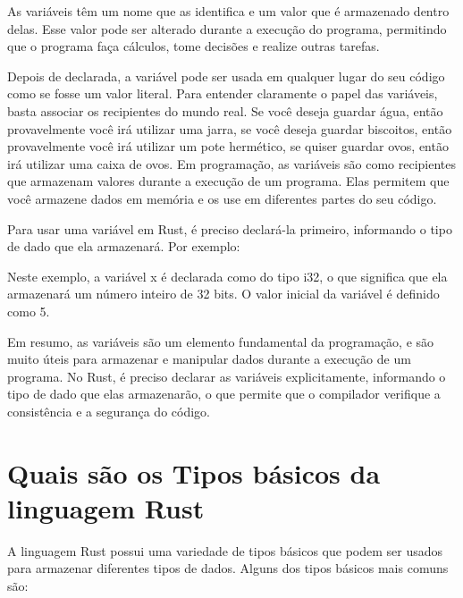 \documentclass[12pt,a4paper,oneside]{abntex2}
\begin{document}
As variáveis têm um nome que as identifica e um valor que é armazenado dentro delas. Esse valor pode ser alterado durante a execução do programa, permitindo que o programa faça cálculos, tome decisões e realize outras tarefas.

Depois de declarada, a variável pode ser usada em qualquer lugar do seu código como se fosse um valor literal. Para entender claramente o papel das variáveis, basta associar os recipientes do mundo real. Se você deseja guardar água, então provavelmente você irá utilizar uma jarra, se você deseja guardar biscoitos, então provavelmente você irá utilizar um pote hermético, se quiser guardar ovos, então irá utilizar uma caixa de ovos. 
Em programação, as variáveis são como recipientes que armazenam valores durante a execução de um programa. Elas permitem que você armazene dados em memória e os use em diferentes partes do seu código.

Para usar uma variável em Rust, é preciso declará-la primeiro, informando o tipo de dado que ela armazenará. Por exemplo:

%

Neste exemplo, a variável x é declarada como do tipo i32, o que significa que ela armazenará um número inteiro de 32 bits. O valor inicial da variável é definido como 5.


%

Em resumo, as variáveis são um elemento fundamental da programação, e são muito úteis para armazenar e manipular dados durante a execução de um programa. No Rust, é preciso declarar as variáveis explicitamente, informando o tipo de dado que elas armazenarão, o que permite que o compilador verifique a consistência e a segurança do código.

\section{Quais são os Tipos básicos da linguagem Rust}

A linguagem Rust possui uma variedade de tipos básicos que podem ser usados para armazenar diferentes tipos de dados. Alguns dos tipos básicos mais comuns são:
\end{document}
